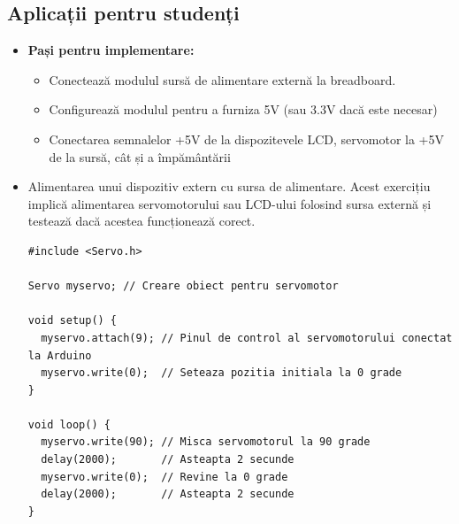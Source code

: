 \documentclass{report}
\begin{document}
\subsection*{Aplicații pentru studenți}
\begin{itemize}
    \item \textbf{Pași pentru implementare: } 
        \begin{itemize}
        \item Conectează modulul sursă de alimentare externă la breadboard.
        \item Configurează modulul pentru a furniza 5V (sau 3.3V dacă este necesar)
        \item Conectarea semnalelor +5V de la dispozitevele LCD, servomotor la +5V de la sursă, cât și a împământării
        \end{itemize}
\end{itemize}
\begin{itemize}
    \item Alimentarea unui dispozitiv extern cu sursa de alimentare. Acest exercițiu implică alimentarea servomotorului sau LCD-ului folosind sursa externă și testează dacă acestea funcționează corect.
    \begin{lstlisting}
#include <Servo.h>

Servo myservo; // Creare obiect pentru servomotor

void setup() {
  myservo.attach(9); // Pinul de control al servomotorului conectat la Arduino
  myservo.write(0);  // Seteaza pozitia initiala la 0 grade
}

void loop() {
  myservo.write(90); // Misca servomotorul la 90 grade
  delay(2000);       // Asteapta 2 secunde
  myservo.write(0);  // Revine la 0 grade
  delay(2000);       // Asteapta 2 secunde
}

    \end{lstlisting}
\end{itemize}






\newpage
\vspace*{1cm}
\end{document}
